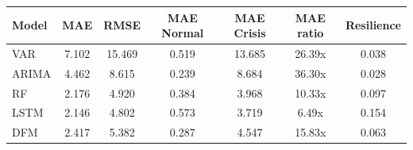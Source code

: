 \begin{tabular}{lcccccc}
\toprule
Model & MAE & RMSE & MAE Normal & MAE Crisis & MAE ratio & Resilience \\
\midrule
VAR & 7.102 & 15.469 & 0.519 & 13.685 & 26.39x & 0.038 \\
ARIMA & 4.462 & 8.615 & 0.239 & 8.684 & 36.30x & 0.028 \\
RF & 2.176 & 4.920 & 0.384 & 3.968 & 10.33x & 0.097 \\
LSTM & 2.146 & 4.802 & 0.573 & 3.719 & 6.49x & 0.154 \\
DFM & 2.417 & 5.382 & 0.287 & 4.547 & 15.83x & 0.063 \\
\bottomrule
\end{tabular}
